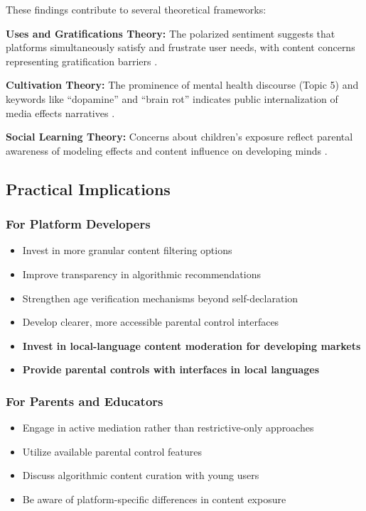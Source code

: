 \documentclass[11pt,a4paper]{article}
\begin{document}
These findings contribute to several theoretical frameworks:

\textbf{Uses and Gratifications Theory:} The polarized sentiment suggests that platforms simultaneously satisfy and frustrate user needs, with content concerns representing gratification barriers \citep{katz1973uses}.

\textbf{Cultivation Theory:} The prominence of mental health discourse (Topic 5) and keywords like ``dopamine'' and ``brain rot'' indicates public internalization of media effects narratives \citep{gerbner1998cultivation}.

\textbf{Social Learning Theory:} Concerns about children's exposure reflect parental awareness of modeling effects and content influence on developing minds \citep{bandura1977social}.

\subsection{Practical Implications}

\subsubsection{For Platform Developers}

\begin{itemize}[leftmargin=*, itemsep=0.3em]
    \item Invest in more granular content filtering options
    \item Improve transparency in algorithmic recommendations
    \item Strengthen age verification mechanisms beyond self-declaration
    \item Develop clearer, more accessible parental control interfaces
    \item \textbf{Invest in local-language content moderation for developing markets}
    \item \textbf{Provide parental controls with interfaces in local languages}
\end{itemize}

\subsubsection{For Parents and Educators}

\begin{itemize}[leftmargin=*, itemsep=0.3em]
    \item Engage in active mediation rather than restrictive-only approaches \citep{livingstone2017parental}
    \item Utilize available parental control features
    \item Discuss algorithmic content curation with young users
    \item Be aware of platform-specific differences in content exposure
\end{itemize}
\end{document}
